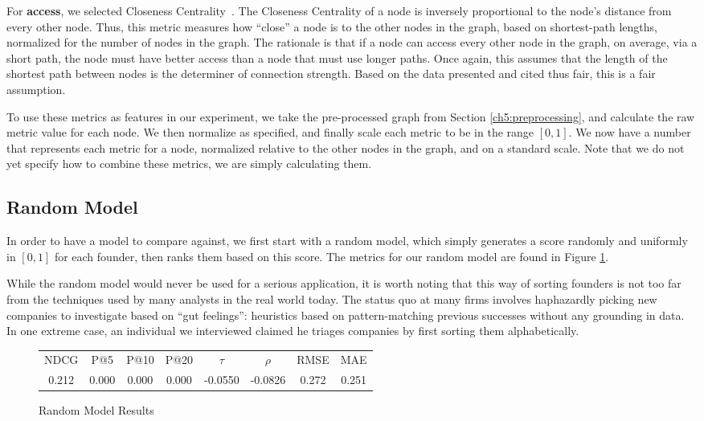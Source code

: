 For \textbf{access}, we selected Closeness Centrality~\cite{FREEMAN1978215}. The Closeness Centrality of a node is inversely proportional to the node's distance from every other node. Thus, this metric measures how ``close'' a node is to the other nodes in the graph, based on shortest-path lengths, normalized for the number of nodes in the graph. The rationale is that if a node can access every other node in the graph, on average, via a short path, the node must have better access than a node that must use longer paths. Once again, this assumes that the length of the shortest path between nodes is the determiner of connection strength. Based on the data presented and cited thus fair, this is a fair assumption.

To use these metrics as features in our experiment, we take the pre-processed graph from Section \ref{ch5:preprocessing}, and calculate the raw metric value for each node. We then normalize as specified, and finally scale each metric to be in the range $[0, 1]$. We now have a number that represents each metric for a node, normalized relative to the other nodes in the graph, and on a standard scale. Note that we do not yet specify how to combine these metrics, we are simply calculating them.

\subsection{Random Model}

In order to have a model to compare against, we first start with a random model, which simply generates a score randomly and uniformly in $[0, 1]$ for each founder, then ranks them based on this score. The metrics for our random model are found in Figure \ref{fig:rand:results}.

While the random model would never be used for a serious application, it is worth noting that this way of sorting founders is not too far from the techniques used by many analysts in the real world today. The status quo at many firms involves haphazardly picking new companies to investigate based on ``gut feelings'': heuristics based on pattern-matching previous successes without any grounding in data. In one extreme case, an individual we interviewed claimed he triages companies by first sorting them alphabetically.

\begin{figure}[ht]
\begin{tabular}{c | c | c | c | c | c | c | c}
NDCG & P@5 & P@10 & P@20 & $\tau$ & $\rho$ & RMSE & MAE  \\
0.212 & 0.000 & 0.000 & 0.000 & -0.0550 & -0.0826 & 0.272 & 0.251 \\
\end{tabular}
\centering
\caption{Random Model Results}
\label{fig:rand:results}
\end{figure}

